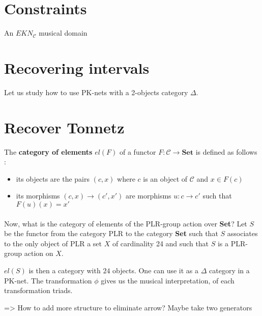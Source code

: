 \section{Constraints}

\begin{defn}[EK-domain]
    An $EKN_\mathcal{C}$ musical domain
\end{defn}

\begin{defn}

\end{defn}


\section{Recovering intervals}

Let us study how to use PK-nets with a 2-objects category $\Delta$.






\section{Recover Tonnetz}


\begin{defn} The \textbf{category of elements} $el(F)$ of a functor $F : \mathcal{C}\rightarrow \textbf{Set}$ is defined as follows :
    \begin{itemize}
        \item its objects are the pairs $(c,x)$ where $c$ is an object of $\mathcal{C}$ and $x\in F(c)$
        \item its morphisms $(c,x)\rightarrow (c',x')$ are morphisms $u : c\rightarrow c'$ such that $F(u)(x) = x'$
    \end{itemize}
\end{defn}
\paragraph{}
Now, what is the category of elements of the PLR-group action over \textbf{Set}? Let $S$ be the functor from the category PLR to the category \textbf{Set} such that $S$ associates to the only object of PLR a set $X$ of cardinality 24 and such that $S$ is a PLR-group action on $X$.

$el(S)$ is then a category with $24$ objects. One can use it as a $\Delta$ category in a PK-net. The transformation $\phi$ gives us the musical interpretation, of each transformation triads.

=> How to add more structure to eliminate arrow? Maybe take two generators